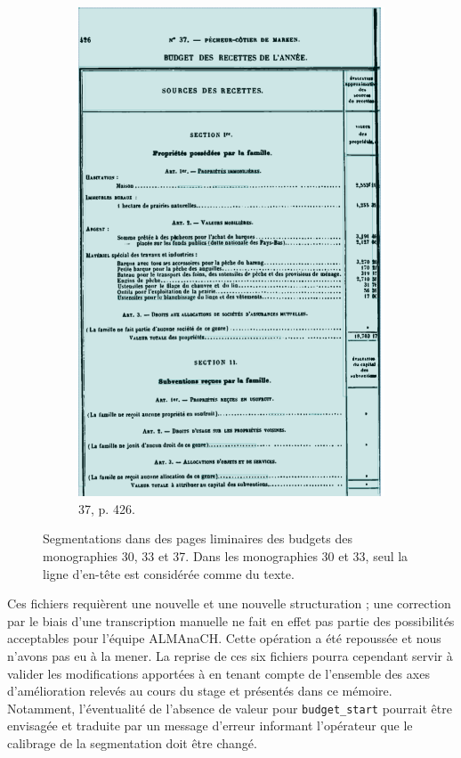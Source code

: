 \begin{figure}[t]
\begin{subfigure}{0.3\textwidth}
     \includegraphics[width=1\linewidth]{img/transkribus_37.png}
     \caption{\no{} 37, p. 426.}
     \label{fig:odm37tkb}
    \end{subfigure}
    \caption[Segmentation défectueuse dans \transkribus{}]{Segmentations dans \transkribus{} des pages liminaires des budgets des monographies \no{} 30,  33 et 37. Dans les monographies 30 et 33, seul la ligne d'en-tête est considérée comme du texte.}
    \label{fig:odmtkbs1t4}
\end{figure}

Ces fichiers requièrent une nouvelle \ocr{} et une nouvelle structuration ; une correction par le biais d'une transcription manuelle ne fait en effet pas partie des possibilités acceptables pour l'équipe ALMAnaCH. Cette opération a été repoussée et nous n'avons pas eu à la mener. La reprise de ces six fichiers pourra cependant servir à valider les modifications apportées à \lse{} en tenant compte de l'ensemble des axes d'amélioration relevés au cours du stage et présentés dans ce mémoire. Notamment, l'éventualité de l'absence de valeur pour \texttt{budget\_start} pourrait 
être envisagée et traduite par un message d'erreur informant l'opérateur que le calibrage de la segmentation doit être changé.

